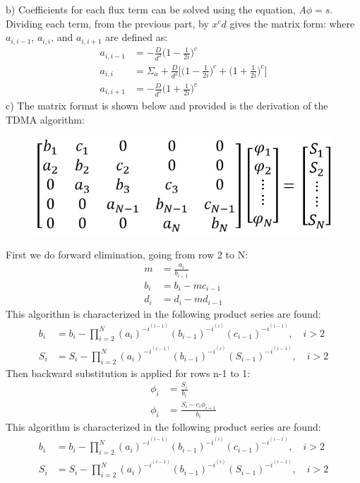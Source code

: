 \documentclass{amsart}
\theoremstyle{definition}
\begin{document}
\newpage
b) Coefficients for each flux term can be solved using the equation, $A\phi = s$. Dividing each term, from the previous part, by $x^cd$ gives the matrix form:
\bigbreak
{}
\bigbreak
where $a_{i,i-1}$, $a_{i,i}$, and $a_{i,i+1}$ are defined as:
\begin{align*}
    a_{i,i-1} &= -\frac{D}{d^2}\bigg(1-\frac{1}{2i}\bigg)^c \\
    a_{i,i} &= \Sigma_a+\frac{D}{d^2}\bigg[\bigg(1-\frac{1}{2i}\bigg)^c+ \bigg(1+\frac{1}{2i}\bigg)^c\bigg] \\
    a_{i,i+1} &= -\frac{D}{d^2}\bigg(1+\frac{1}{2i}\bigg)^c
\end{align*}
\bigbreak
c) The matrix format is shown below and provided is the derivation of the TDMA algorithm:
\begin{figure}[h!]
                \includegraphics[width=.5\linewidth]{TDMA.JPG}
\end{figure}
\bigbreak
First we do forward elimination, going from row 2 to N:
\begin{align*}
    m &= \frac{a_i}{b_{i-1}} \\
    b_i &= b_i - mc_{i-1} \\
    d_i &= d_i - md_{i-1}
\end{align*}
This algorithm is characterized in the following product series are found:
\begin{align*}
    b_i &= b_i - \prod_{i = 2}^{N} (a_i)^{-i^{(i-1)}} (b_{i-1})^{-i^{(i)}} (c_{i-1})^{-i^{(i-1)}}, \quad i>2 \\
    S_i &= S_i - \prod_{i = 2}^{N} (a_i)^{-i^{(i-1)}} (b_{i-1})^{-i^{(i)}} (S_{i-1})^{-i^{(i-1)}}, \quad i>2
\end{align*}
Then backward substitution is applied for rows n-1 to 1:
\begin{align*}
    \phi_i &= \frac{S_i}{b_i} \\
    \phi_i &= \frac{S_i-c_i\phi_{i+1}}{b_i}
\end{align*}
This algorithm is characterized in the following product series are found:
\begin{align*}
    b_i &= b_i - \prod_{i = 2}^{N} (a_i)^{-i^{(i-1)}} (b_{i-1})^{-i^{(i)}} (c_{i-1})^{-i^{(i-1)}}, \quad i>2 \\
    S_i &= S_i - \prod_{i = 2}^{N} (a_i)^{-i^{(i-1)}} (b_{i-1})^{-i^{(i)}} (S_{i-1})^{-i^{(i-1)}}, \quad i>2
\end{align*}
 
\end{document}
